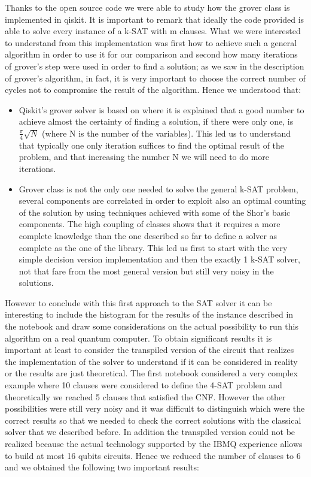 \documentclass[english]{article}
\begin{document}
				Thanks to the open source code we were able to study how the grover class is implemented in qiskit. It is important to remark that ideally the code provided is able to solve every instance of a k-SAT with m clauses. What we were interested to understand from this implementation was first how to achieve such a general algorithm in order to use it for our comparison and second how many iterations of grover's step were used in order to find a solution; as we saw in the description of grover's algorithm, in fact, it is very important to choose the correct number of cycles not to compromise the result of the algorithm. Hence we understood that:
				\begin{itemize}
					\item Qiskit's grover solver is based on \cite[Boyer M., Brassard G., Hoyer P. and Tapp A.]{qiskitGrover} where it is explained that a good number to achieve almost the certainty of finding a solution, if there were only one, is $\frac{\pi}{4}\sqrt{N}$ (where N is the number of the variables). This led us to understand that typically one only iteration suffices to find the optimal result of the problem, and that increasing the number N we will need to do more iterations.
					
					\item Grover class is not the only one needed to solve the general k-SAT problem, several components are correlated in order to exploit also an optimal counting of the solution by using techniques achieved with some of the Shor's basic components. The high coupling of classes shows that it requires a more complete knowledge than the one described so far to define a solver as complete as the one of the library. This led us first to start with the very simple decision version implementation and then the exactly 1 k-SAT solver, not that fare from the most general version but still very noisy in the solutions.
				\end{itemize}
				However to conclude with this first approach to the SAT solver it can be interesting to include the histogram for the results of the instance described in the notebook and draw some considerations on the actual possibility to run this algorithm on a real quantum computer. To obtain significant results it is important at least to consider the transpiled version of the circuit that realizes the implementation of the solver to understand if it can be considered in reality or the results are just theoretical. The first notebook considered a very complex example where 10 clauses were considered to define the 4-SAT problem and theoretically we reached 5 clauses that satisfied the CNF. However the other possibilities were still very noisy and it was difficult to distinguish which were the correct results so that we needed to check the correct solutions with the classical solver that we described before. In addition the transpiled version could not be realized because the actual technology supported by the IBMQ experience allows to build at most 16 qubits circuits. Hence we reduced the number of clauses to 6 and we obtained the following two important results:
\end{document}
